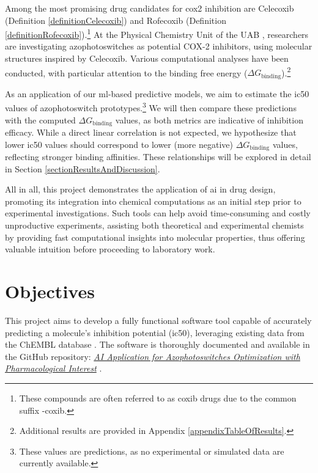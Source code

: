 \documentclass[11pt]{article}
\begin{document}
Among the most promising drug candidates for \gls{cox2} inhibition are Celecoxib (Definition \ref{definitionCelecoxib}) and Rofecoxib (Definition \ref{definitionRofecoxib}).\footnote{These compounds are often referred to as coxib drugs due to the common suffix -coxib.} At the Physical Chemistry Unit of the UAB \cite{UAB_ComputationalChemistry}, researchers are investigating azophotoswitches as potential COX-2 inhibitors, using molecular structures inspired by Celecoxib. Various computational analyses have been conducted, with particular attention to the binding free energy ($\Delta G_{\text{binding}}$).\footnote{Additional results are provided in Appendix \ref{appendixTableOfResults}.}

As an application of our \gls{ml}-based predictive models, we aim to estimate the \gls{ic50} values of azophotoswitch prototypes.\footnote{These values are predictions, as no experimental or simulated data are currently available.} We will then compare these predictions with the computed $\Delta G_{\text{binding}}$ values, as both metrics are indicative of inhibition efficacy. While a direct linear correlation is not expected, we hypothesize that lower \gls{ic50} values should correspond to lower (more negative) $\Delta G_{\text{binding}}$ values, reflecting stronger binding affinities. These relationships will be explored in detail in Section \ref{sectionResultsAndDiscussion}.

All in all, this project demonstrates the application of \gls{ai} in drug design, promoting its integration into chemical computations as an initial step prior to experimental investigations. Such tools can help avoid time-consuming and costly unproductive experiments, assisting both theoretical and experimental chemists by providing fast computational insights into molecular properties, thus offering valuable intuition before proceeding to laboratory work.

\newpage
\section{Objectives}

This project aims to develop a fully functional software tool capable of accurately predicting a molecule’s inhibition potential (\gls{ic50}), leveraging existing data from the ChEMBL database \cite{ChemblDatabase}. The software is thoroughly documented and available in the GitHub repository: \href{https://github.com/SirSergi0/Repository—AI-application-for-azophotoswitches-optimization-with-pharmacological-interest}{\emph{AI Application for Azophotoswitches Optimization with Pharmacological Interest}} \cite{GitHub}\cite{azophotoswitches2025}.
\end{document}
